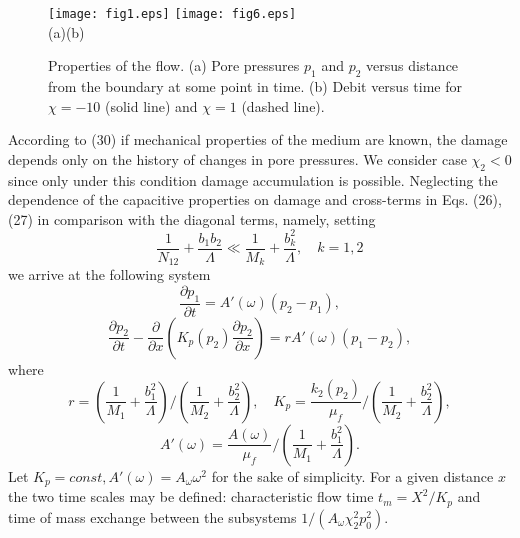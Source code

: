 \documentclass[article,authoryear,jpm]{beg_39}             %
\begin{document}
\begin{figure}[!b]
	\centering
\texttt{[image: fig1.eps]} %
\texttt{[image: fig6.eps]} \\
  (a)\hspace*{220pt}(b)
\caption{ Properties of the flow. (a) Pore pressures $p_1$ and $p_2$ versus distance from the boundary at some point in time. (b) Debit versus time for $\chi=-10$ (solid line) and $\chi=1$ (dashed line).}
\label{fig2}
\end{figure}

According to (30) if mechanical properties of the medium are known, the damage depends only on the history of changes in pore pressures.
We consider case ${{\chi}_{2}}< 0$ since only under this condition damage accumulation is possible.
Neglecting the dependence of the capacitive properties on damage and cross-terms in Eqs. (26), (27) in comparison with the diagonal terms, namely, setting
\begin{equation}
\frac{1}{{{N}_{12}}}+\frac{{{b}_{1}}{{b}_{2}}}{\Lambda}\ll \frac{1}{{{M}_{k}}}+\frac{b_{k}^{2}}{\Lambda},\quad k=1,2
\end{equation}
we arrive at the following system
\begin{equation}
\frac{\partial {{p}_{1}}}{\partial t}=A'(\omega )({{p}_{2}}-{{p}_{1}}),
\end{equation}
\begin{equation}
\frac{\partial {{p}_{2}}}{\partial t}-\frac{\partial }{\partial x}\left( {{K}_{p}}({{p}_{2}})\frac{\partial {{p}_{2}}}{\partial x} \right)=rA'(\omega )({{p}_{1}}-{{p}_{2}}),
\end{equation}
where
\begin{equation}
r=\left( \frac{1}{{{M}_{1}}}+\frac{b_{1}^{2}}{\Lambda} \right)/\left( \frac{1}{{{M}_{2}}}+\frac{b_{2}^{2}}{\Lambda} \right),\quad {{K}_{p}}=\frac{{{k}_{2}}({{p}_{2}})}{{{\mu }_{f}}}/\left( \frac{1}{{{M}_{2}}}+\frac{b_{2}^{2}}{\Lambda} \right),
\end{equation}
\begin{equation}
A'(\omega )=\frac{A(\omega )}{\mu_f}/ \left( \frac{1}{{{M}_{1}}}+\frac{b_{1}^{2}}{\Lambda}\right).
\end{equation}
Let ${{K}_{p}}=const, A'(\omega )={{A}_{\omega }}{{\omega }^{2}}$ for the sake of simplicity.
For a given distance $x$ the two time scales may be defined: characteristic flow time ${{t}_{m}}={{X}^{2}}/{{K}_{p}}$ and time of mass exchange between the subsystems $1/({{A}_{\omega }}\chi_{2}^{2}p_{0}^{2})$.
\end{document}
